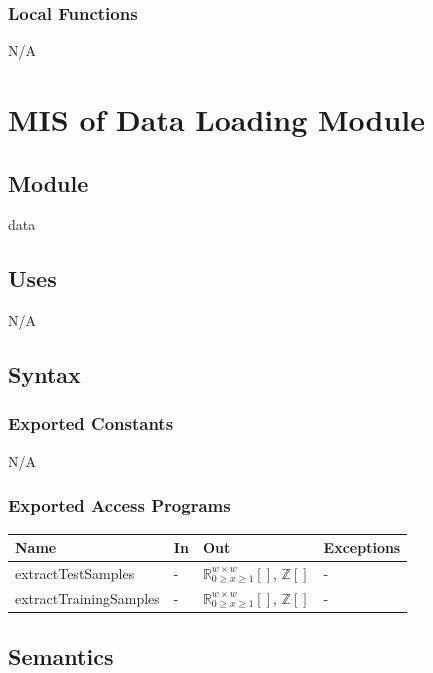 \documentclass[12pt, titlepage]{article}
\begin{document}
\subsubsection{Local Functions}

N/A

\newpage
\section{MIS of Data Loading Module} \label{MDataLoading}

\subsection{Module}

data
\subsection{Uses}

N/A

\subsection{Syntax}

\subsubsection{Exported Constants}

N/A

\subsubsection{Exported Access Programs}


\begin{center}
\begin{tabular}{p{5cm} p{2cm} p{4cm} p{2cm}}
\hline
\textbf{Name} & \textbf{In} & \textbf{Out} & \textbf{Exceptions} \\
\hline
extractTestSamples & - & ${\mathbb{R}^{w \times w}_{0 \ge x \ge 1}[]}$, ${\mathbb{Z}[]}$ & - \\
extractTrainingSamples & - & ${\mathbb{R}^{w \times w}_{0 \ge x \ge 1}[]}$, ${\mathbb{Z}[]}$ & - \\
\hline
\end{tabular}
\end{center}

\subsection{Semantics}
\end{document}
